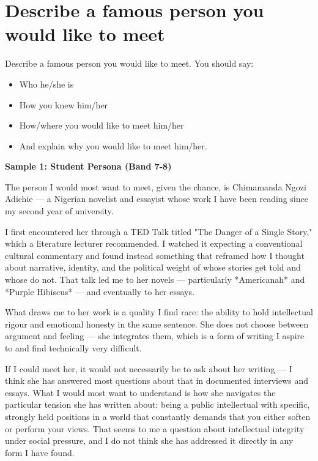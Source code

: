 \section{Describe a famous person you would like to meet}
\begin{ieltsprompt}
Describe a famous person you would like to meet.
You should say:
\begin{itemize}[leftmargin=2em, itemsep=2pt]
\item Who he/she is
\item How you knew him/her
\item How/where you would like to meet him/her
\item And explain why you would like to meet him/her.
\end{itemize}
\end{ieltsprompt}
\begin{ieltsanswer}
\textbf{Sample 1: Student Persona (Band 7-8)}

The person I would most want to meet, given the chance, is Chimamanda Ngozi Adichie — a Nigerian novelist and essayist whose work I have been reading since my second year of university.

I first encountered her through a TED Talk titled "The Danger of a Single Story," which a literature lecturer recommended. I watched it expecting a conventional cultural commentary and found instead something that reframed how I thought about narrative, identity, and the political weight of whose stories get told and whose do not. That talk led me to her novels — particularly *Americanah* and *Purple Hibiscus* — and eventually to her essays.

What draws me to her work is a quality I find rare: the ability to hold intellectual rigour and emotional honesty in the same sentence. She does not choose between argument and feeling — she integrates them, which is a form of writing I aspire to and find technically very difficult.

If I could meet her, it would not necessarily be to ask about her writing — I think she has answered most questions about that in documented interviews and essays. What I would most want to understand is how she navigates the particular tension she has written about: being a public intellectual with specific, strongly held positions in a world that constantly demands that you either soften or perform your views. That seems to me a question about intellectual integrity under social pressure, and I do not think she has addressed it directly in any form I have found.


\end{ieltsanswer}
